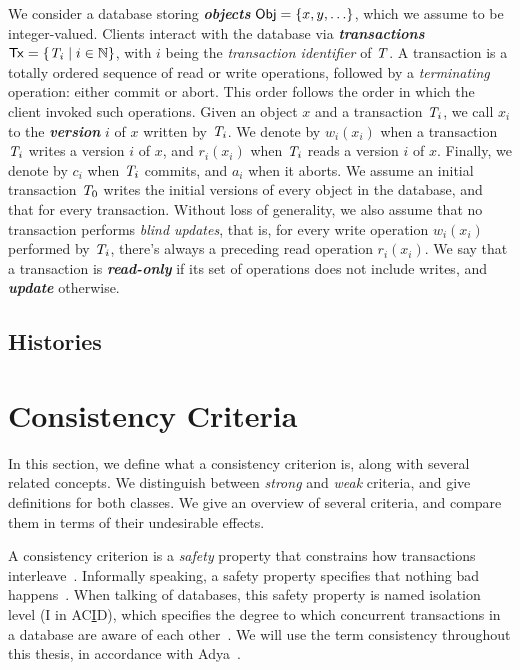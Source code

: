 We consider a database storing \textbf{\em objects} ${\sf Obj} = \{x, y, \ldots\}$, which we assume to be integer-valued. Clients interact with the database via \textbf{\em transactions} ${\sf Tx} = \{\mathit{T}_i \mid i \in \mathbb{N}\}$, with $i$ being the \emph{transaction identifier} of $\mathit{T}$. A transaction is a totally ordered sequence of read or write operations, followed by a \emph{terminating} operation: either commit or abort. This order follows the order in which the client invoked such operations. Given an object $x$ and a transaction $\mathit{T}_i$, we call $x_i$ to the \textbf{\em version} $i$ of $x$ written by $\mathit{T}_i$. We denote by $w_i(x_i)$ when a transaction $\mathit{T}_i$ writes a version $i$ of $x$, and $r_i(x_i)$ when $\mathit{T}_i$ reads a version $i$ of $x$. Finally, we denote by $c_i$ when $\mathit{T}_i$ commits, and $a_i$ when it aborts. We assume an initial transaction $\mathit{T}_0$ writes the initial versions of every object in the database, and that for every transaction. Without loss of generality, we also assume that no transaction performs \emph{blind updates}, that is, for every write operation $w_i(x_i)$ performed by $\mathit{T}_i$, there's always a preceding read operation $r_i(x_i)$. We say that a transaction is \textbf{\em read-only} if its set of operations does not include writes, and \textbf{\em update} otherwise.

\subsection{Histories}



\section{Consistency Criteria}

In this section, we define what a consistency criterion is, along with several related concepts. We distinguish between \emph{strong} and \emph{weak} criteria, and give definitions for both classes. We give an overview of several criteria, and compare them in terms of their undesirable effects.

A consistency criterion is a \emph{safety} property that constrains how transactions interleave~\citep{ardekani_thesis}. Informally speaking, a safety property specifies that nothing bad happens~\citep{lamport_safety}. When talking of databases, this safety property is named isolation level (I in AC\underline{I}D), which specifies the degree to which concurrent transactions in a database are aware of each other~\citep{adya_thesis}. We will use the term consistency throughout this thesis, in accordance with Adya~\citep{adya_thesis}.


